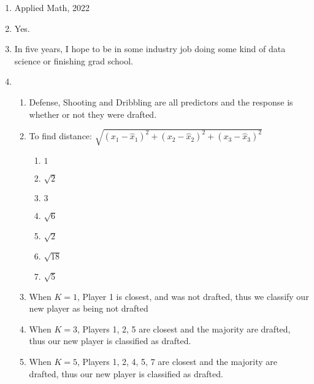 \documentclass[10pt]{exam}
\begin{document}
\newcommand{\dd}{\textrm{d}}
\newcommand{\NN}{\mathbb N}
\newcommand{\CC}{\mathbb C}
\newcommand{\QQ}{\mathbb Q}
\newcommand{\ZZ}{\mathbb Z}
\newcommand{\RR}{\mathbb R}
\newcommand{\proofdone}{\hfill $\square$}



\begin{enumerate}
    \item Applied Math, 2022
    \item Yes.
    \item In five years, I hope to be in some industry job doing some kind of data 
    science or finishing grad school. 
    \item 
    \begin{enumerate}
        \item Defense, Shooting and Dribbling are all predictors and the response is 
        whether or not they were drafted. 
        \item To find distance: $\sqrt{(x_{1} - \hat{x}_{1})^2 +(x_{2} - \hat{x}_{2})^2 + (x_{3} - \hat{x}_{3})^2} $
        \begin{enumerate}
            \item $1$
            \item $\sqrt{2}$
            \item $3$
            \item $\sqrt{6}$
            \item $\sqrt{2}$
            \item $\sqrt{18}$
            \item $\sqrt{5}$
        \end{enumerate}
        \item When $K = 1$, Player 1 is closest, and was not drafted, thus we classify
        our new player as being not drafted
        \item When $K = 3$, Players 1, 2, 5 are closest and the majority are drafted, 
        thus our new player is classified as drafted.
        \item When $K = 5$, Players 1, 2, 4, 5, 7 are closest and the majority are drafted, 
        thus our new player is classified as drafted.
    \end{enumerate}
\end{enumerate}
\end{document}
